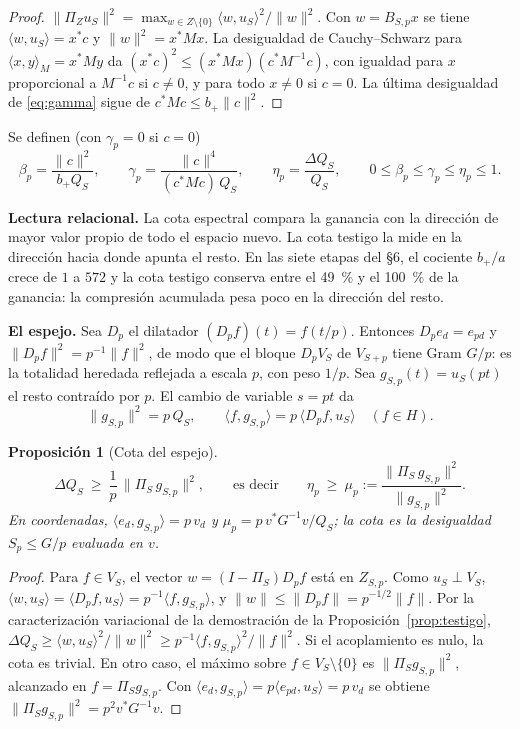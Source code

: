 \documentclass[11pt,a4paper]{article}
\theoremstyle{plain}
\newtheorem{proposicion}{Proposición}
\begin{document}
\begin{proof}
$\|\Pi_{Z}u_S\|^2=\max_{w\in Z\setminus\{0\}}\langle w,u_S\rangle^2/\|w\|^2$. Con $w=B_{S,p}x$ se tiene $\langle w,u_S\rangle=x^*c$ y $\|w\|^2=x^*Mx$. La desigualdad de Cauchy–Schwarz para $\langle x,y\rangle_M=x^*My$ da $(x^*c)^2\le(x^*Mx)(c^*M^{-1}c)$, con igualdad para $x$ proporcional a $M^{-1}c$ si $c\ne0$, y para todo $x\ne0$ si $c=0$. La última desigualdad de \eqref{eq:gamma} sigue de $c^*Mc\le b_+\|c\|^2$.
\end{proof}

Se definen (con $\gamma_p=0$ si $c=0$)
\[
\beta_p=\frac{\|c\|^2}{b_+Q_S},\qquad \gamma_p=\frac{\|c\|^4}{(c^*Mc)\,Q_S},\qquad \eta_p=\frac{\Delta Q_S}{Q_S},\qquad 0\le\beta_p\le\gamma_p\le\eta_p\le 1 .
\]

\textbf{Lectura relacional.} La cota espectral compara la ganancia con la dirección de mayor valor propio de todo el espacio nuevo. La cota testigo la mide en la dirección hacia donde apunta el resto. En las siete etapas del §6, el cociente $b_+/a$ crece de $1$ a $572$ y la cota testigo conserva entre el 49~\% y el 100~\% de la ganancia: la compresión acumulada pesa poco en la dirección del resto.

\textbf{El espejo.} Sea $D_p$ el dilatador $(D_pf)(t)=f(t/p)$. Entonces $D_pe_d=e_{pd}$ y $\|D_pf\|^2=p^{-1}\|f\|^2$, de modo que el bloque $D_pV_S$ de $V_{S+p}$ tiene Gram $G/p$: es la totalidad heredada reflejada a escala $p$, con peso $1/p$. Sea $g_{S,p}(t)=u_S(pt)$ el resto contraído por $p$. El cambio de variable $s=pt$ da
\[
\|g_{S,p}\|^2=p\,Q_S,\qquad \langle f,g_{S,p}\rangle=p\,\langle D_pf,u_S\rangle\quad(f\in H).
\]

\begin{proposicion}[Cota del espejo]\label{prop:espejo}
\begin{equation}\label{eq:espejo}
\Delta Q_S\ \ge\ \frac1p\,\bigl\|\Pi_S\,g_{S,p}\bigr\|^2,\qquad\text{es decir}\qquad \eta_p\ \ge\ \mu_p:=\frac{\|\Pi_S\,g_{S,p}\|^2}{\|g_{S,p}\|^2}.
\end{equation}
En coordenadas, $\langle e_d,g_{S,p}\rangle=p\,v_d$ y $\mu_p=p\,v^*G^{-1}v/Q_S$; la cota es la desigualdad $S_p\le G/p$ evaluada en $v$.
\end{proposicion}

\begin{proof}
Para $f\in V_S$, el vector $w=(I-\Pi_S)D_pf$ está en $Z_{S,p}$. Como $u_S\perp V_S$, $\langle w,u_S\rangle=\langle D_pf,u_S\rangle=p^{-1}\langle f,g_{S,p}\rangle$, y $\|w\|\le\|D_pf\|=p^{-1/2}\|f\|$. Por la caracterización variacional de la demostración de la Proposición~\ref{prop:testigo}, $\Delta Q_S\ge\langle w,u_S\rangle^2/\|w\|^2\ge p^{-1}\langle f,g_{S,p}\rangle^2/\|f\|^2$. Si el acoplamiento es nulo, la cota es trivial. En otro caso, el máximo sobre $f\in V_S\setminus\{0\}$ es $\|\Pi_Sg_{S,p}\|^2$, alcanzado en $f=\Pi_Sg_{S,p}$. Con $\langle e_d,g_{S,p}\rangle=p\langle e_{pd},u_S\rangle=p\,v_d$ se obtiene $\|\Pi_Sg_{S,p}\|^2=p^2v^*G^{-1}v$.
\end{proof}
\end{document}
